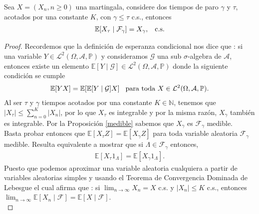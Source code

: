 \begin{theorem} 
\label{opcional}
	Sea $X = (X_n, n \geq 0)$ una martingala, considere dos tiempos de paro $\gamma$ y $\tau$, acotados por una constante $K$, con $\gamma \leq \tau$ c.s., entonces
	\begin{align*}
	\mathbb{E}[X_{\tau} \mid \mathcal{F}_{\gamma}] = X_{\gamma}, \hspace{0.3cm} \text{c.s.}
	\end{align*}
\end{theorem}
\begin{proof}
	Recordemos que la definición de esperanza condicional nos dice que \cite[p.~200]{jacodprotter}: si una variable $Y \in \mathcal{L}^2(\Omega, \mathcal{A}, \mathbb{P})$ y consideramos $\mathcal{G}$ una sub $\sigma$-algebra de $\mathcal{A}$, entonces existe un elemento $\mathbb{E}[Y \mid \mathcal{G}] \in \mathcal{L}^2(\Omega, \mathcal{A}, \mathbb{P})$ donde la siguiente condición se cumple
	\begin{align*}
		\mathbb{E}[YX] = \mathbb{E}[\mathbb{E}[Y \mid \mathcal{G}] X] \hspace{0.3cm} \text{para toda } X \in \mathcal{L}^2(\Omega, \mathcal{A}, \mathbb{P}).
	\end{align*}
	Al ser $\tau$ y $\gamma$ tiempos acotados por una constante $K \in \mathbb{N}$, tenemos que $|X_{\tau}| \leq \sum_{n=0}^{K} |X_n|$, por lo que $X_{\tau}$ es integrable y por la misma razón, $X_{\gamma}$ también es integrable. Por la Proposición \ref{medible} sabemos que $X_{\gamma}$  es $\mathcal{F}_{\gamma}$ medible. \\
	
	Basta probar entonces que $\mathbb{E}[X_{\tau} Z] = \mathbb{E}[X_{\gamma} Z]$ para toda variable aleatoria $\mathcal{F}_{\gamma}$ medible. Resulta equivalente a mostrar que si $\Lambda \in \mathcal{F}_{\gamma}$ entonces,
	\begin{align*}
		\mathbb{E}[X_{\tau} 1_{\Lambda}] = \mathbb{E}[X_{\gamma} 1_{\Lambda}].
	\end{align*}
	Puesto que podemos aproximar una variable aleatoria cualquiera a partir de variables aleatorias simples y usando el Teorema de Convergencia Dominada de Lebesgue el cual afirma que \cite[p.~187]{shiryaev}: si $\lim_{n \rightarrow \infty} X_n = X$ c.s. y $|X_n| \leq K$ c.s., entonces $\lim_{n \rightarrow \infty} \mathbb{E}[X_n \mid \mathcal{F}] = \mathbb{E}[X \mid \mathcal{F}]$. \\
	

\end{proof}
